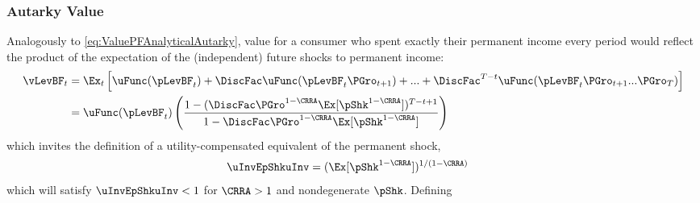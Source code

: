 \documentclass[BufferStockTheory]{subfiles}
\begin{document}
\subsubsection{Autarky Value}
Analogously to \eqref{eq:ValuePFAnalyticalAutarky}, value for a consumer who spent exactly their permanent income every period would reflect the product of the expectation of the (independent) future shocks to permanent income:\hypertarget{uInvEpShkuInv}{}
\begin{align*}
  \vLevBF_{t}  & = \Ex_{t}\left[\uFunc(\pLevBF_{t}) + \DiscFac \uFunc(\pLevBF_{t}\PGro_{t+1}) + ... + \DiscFac^{T-t}\uFunc(\pLevBF_{t}\PGro_{t+1}...\PGro_{T})\right] \\
               & = \uFunc(\pLevBF_{t})\left(\frac{1-(\DiscFac \PGro^{1-\CRRA}\Ex[\pShk^{1-\CRRA}])^{T-t+1}}{1-\DiscFac \PGro^{1-\CRRA} \Ex[\pShk^{1-\CRRA}]}\right)
\end{align*}
which invites the definition of a utility-compensated equivalent of the permanent shock,\hypertarget{PGrouAdj}{}
\begin{align}
  \uInvEpShkuInv  & = (\Ex[\pShk^{1-\CRRA}])^{1/(1-\CRRA)} \label{eq:uInvEpShkuInv}
\end{align}
which will satisfy $\uInvEpShkuInv < 1$ for $\CRRA>1$ and nondegenerate $\pShk$.%
\hypertarget{DiscAltuAdj}{} Defining
\end{document}

